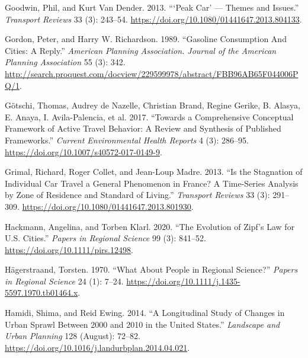 \documentclass[
  12pt,
]{article}
\newlength{\cslhangindent}
\newlength{\cslentryspacingunit} %
\newenvironment{CSLReferences}[2] %
 {%
  \setlength{\parindent}{0pt}
  \ifodd #1
  \let\oldpar\par
  \def\par{\hangindent=\cslhangindent\oldpar}
  \fi
  \setlength{\parskip}{#2\cslentryspacingunit}
 }%
 {}
\begin{document}
\begin{CSLReferences}{1}{0}
\leavevmode{}%
Goodwin, Phil, and Kurt Van Dender. 2013. {``{`{Peak Car}'} --- {Themes} and {Issues}.''} \emph{Transport Reviews} 33 (3): 243--54. \url{https://doi.org/10.1080/01441647.2013.804133}.

\leavevmode{}%
Gordon, Peter, and Harry W. Richardson. 1989. {``Gasoline {Consumption And Cities}: {A Reply}.''} \emph{American Planning Association. Journal of the American Planning Association} 55 (3): 342. \url{http://search.proquest.com/docview/229599978/abstract/FBB96AB65F044006PQ/1}.

\leavevmode{}%
Götschi, Thomas, Audrey de Nazelle, Christian Brand, Regine Gerike, B. Alasya, E. Anaya, I. Avila-Palencia, et al. 2017. {``Towards a {Comprehensive Conceptual Framework} of {Active Travel Behavior}: A {Review} and {Synthesis} of {Published Frameworks}.''} \emph{Current Environmental Health Reports} 4 (3): 286--95. \url{https://doi.org/10.1007/s40572-017-0149-9}.

\leavevmode{}%
Grimal, Richard, Roger Collet, and Jean-Loup Madre. 2013. {``Is the {Stagnation} of {Individual Car Travel} a {General Phenomenon} in {France}? {A Time-Series Analysis} by {Zone} of {Residence} and {Standard} of {Living}.''} \emph{Transport Reviews} 33 (3): 291--309. \url{https://doi.org/10.1080/01441647.2013.801930}.

\leavevmode{}%
Hackmann, Angelina, and Torben Klarl. 2020. {``The Evolution of {Zipf}'s {Law} for {U}.{S}. Cities.''} \emph{Papers in Regional Science} 99 (3): 841--52. \url{https://doi.org/10.1111/pirs.12498}.

\leavevmode{}%
Hägerstraand, Torsten. 1970. {``What {About People} in {Regional Science}?''} \emph{Papers in Regional Science} 24 (1): 7--24. \url{https://doi.org/10.1111/j.1435-5597.1970.tb01464.x}.

\leavevmode{}%
Hamidi, Shima, and Reid Ewing. 2014. {``A Longitudinal Study of Changes in Urban Sprawl Between 2000 and 2010 in the {United States}.''} \emph{Landscape and Urban Planning} 128 (August): 72--82. \url{https://doi.org/10.1016/j.landurbplan.2014.04.021}.


\end{CSLReferences}
\end{document}
